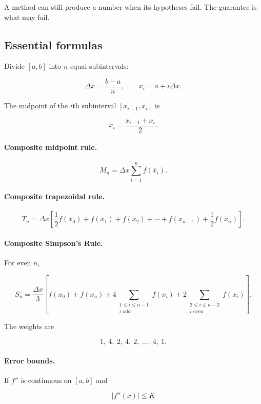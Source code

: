 A method can still produce a number when its hypotheses fail.  The guarantee is what
may fail.

\subsection{Essential formulas}
\label{subsec:chapter-12-essential-formulas}

Divide \([a,b]\) into \(n\) equal subintervals:

\[
\Delta x=\frac{b-a}{n},
\qquad
x_i=a+i\Delta x.
\]

The midpoint of the \(i\)th subinterval \([x_{i-1},x_i]\) is

\[
\overline{x}_i=\frac{x_{i-1}+x_i}{2}.
\]

\paragraph{Composite midpoint rule.}

\[
\boxed{
M_n=\Delta x\sum_{i=1}^n f(\overline{x}_i).
}
\]

\paragraph{Composite trapezoidal rule.}

\[
\boxed{
T_n=
\Delta x\left[
\frac12 f(x_0)+f(x_1)+f(x_2)+\cdots+f(x_{n-1})+\frac12 f(x_n)
\right].
}
\]

\paragraph{Composite Simpson's Rule.}

For even \(n\),

\[
\boxed{
S_n=
\frac{\Delta x}{3}
\left[
f(x_0)+f(x_n)
+
4\sum_{\substack{1\le i\le n-1\\ i\text{ odd}}} f(x_i)
+
2\sum_{\substack{2\le i\le n-2\\ i\text{ even}}} f(x_i)
\right].
}
\]

The weights are

\[
1,\ 4,\ 2,\ 4,\ 2,\ \ldots,\ 4,\ 1.
\]

\paragraph{Error bounds.}

If \(f''\) is continuous on \([a,b]\) and

\[
|f''(x)|\le K
\]


